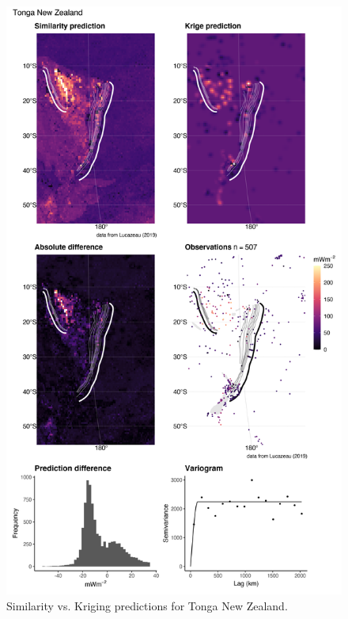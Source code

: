 \documentclass[draft,linenumbers]{agujournal2018}
\begin{document}
\begin{figure}[h]

{\centering \includegraphics[width=0.95\linewidth,]{../figs/diff/comp/Tonga_New_Zealand} 

}

\caption{Similarity vs. Kriging predictions for Tonga New Zealand.}\label{fig:tonga.new.zealand.comp}
\end{figure}
\end{document}
